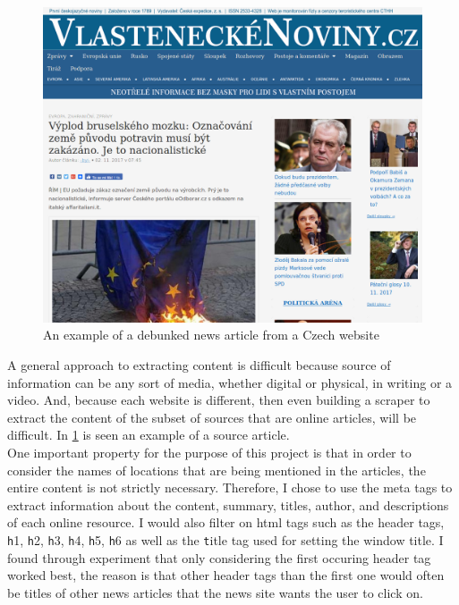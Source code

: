 \documentclass{article}
\begin{document}
\begin{figure}[H]
    \centering
    \caption{An example of a debunked news article from a Czech website}
    \label{fig:fake_source}
    \includegraphics[width=.9\textwidth]{images/example_source.png}
\end{figure}
A general approach to extracting content is difficult because source of information can be any sort of media, whether digital or physical, in writing or a video. And, because each website is different, then even building a scraper to extract the content of the subset of sources that are online articles, will be difficult. In \cref{fig:fake_source} is seen an example of a source article.
\\
One important property for the purpose of this project is that in order to consider the names of locations that are being mentioned in the articles, the entire content is not strictly necessary. Therefore, I chose to use the meta tags to extract information about the content, summary, titles, author, and descriptions of each online resource.
I would also filter on html tags such as the header tags, {\texttt h1}, {\texttt h2}, {\texttt h3}, {\texttt h4}, {\texttt h5}, {\texttt h6} as well as the {\texttt title} tag used for setting the window title. I found through experiment that only considering the first occuring header tag worked best, the reason is that other header tags than the first one would often be titles of other news articles that the news site wants the user to click on.
\end{document}
